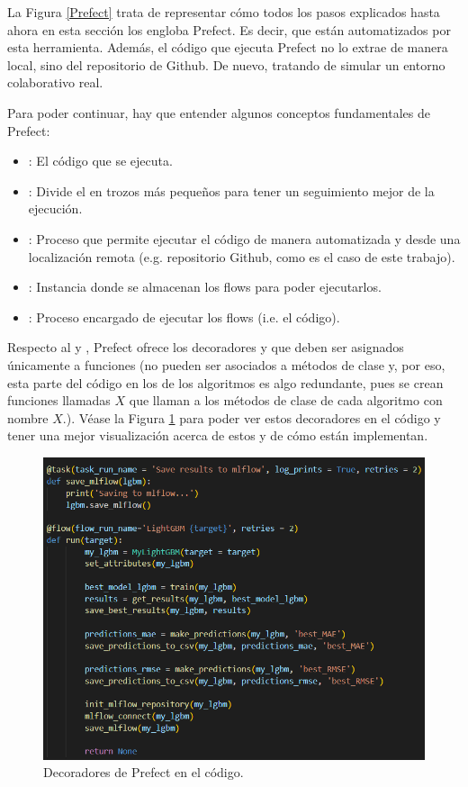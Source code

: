 La Figura \ref{Prefect} trata de representar cómo todos los pasos explicados hasta ahora en esta sección los engloba Prefect. Es decir, que están automatizados por esta herramienta. Además, el código que ejecuta Prefect no lo extrae de manera local, sino del repositorio de Github. De nuevo, tratando de simular un entorno colaborativo real.

Para poder continuar, hay que entender algunos conceptos fundamentales de Prefect:
\begin{itemize}
    \item {}: El código que se ejecuta.
    \item {}: Divide el  en trozos más pequeños para tener un seguimiento mejor de la ejecución.
    \item {}: Proceso que permite ejecutar el código de manera automatizada y desde una localización remota (e.g. repositorio Github, como es el caso de este trabajo).
    \item {}: Instancia donde se almacenan los flows para poder ejecutarlos.
    \item {}: Proceso encargado de ejecutar los flows (i.e. el código).
\end{itemize}

Respecto al  y , Prefect ofrece los decoradores  y  que deben ser asignados únicamente a funciones (no pueden ser asociados a métodos de clase y, por eso, esta parte del código en los  de los algoritmos es algo redundante, pues se crean funciones llamadas $X$ que llaman a los métodos de clase  de cada algoritmo con nombre $X$.). Véase la Figura \ref{PrefectDecorators} para poder ver estos decoradores en el código y tener una mejor visualización acerca de estos y de cómo están implementan.

\begin{figure}[H]
    \centering
    \includegraphics[scale = 0.65]{imgs/prefect_decorators.png}
    \caption{Decoradores de Prefect en el código.}
    \label{PrefectDecorators}
\end{figure}

